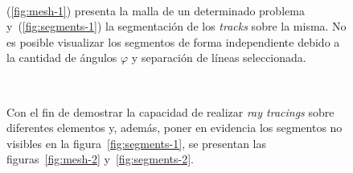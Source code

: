 \documentclass[11pt]{article}
\numberwithin{equation}{section}
\begin{document}
\begin{figure}[!ht]
 \begin{center}
  \\
  \caption{(\ref{fig:mesh-1}) presenta la malla de un determinado problema y~(\ref{fig:segments-1}) la segmentación de los \emph{tracks} sobre la misma. No es posible visualizar los segmentos de forma independiente debido a la cantidad de ángulos $\varphi$ y separación de líneas seleccionada.}
  \label{fig:mesh-and-segments-1}
 \end{center}
\end{figure}

\begin{figure}[!ht]
 \begin{center}
  \\
  \caption{Con el fin de demostrar la capacidad de realizar \emph{ray tracings} sobre diferentes elementos y, además, poner en evidencia los segmentos no visibles en la figura~\ref{fig:segments-1}, se presentan las figuras~\ref{fig:mesh-2} y~\ref{fig:segments-2}.}
  \label{fig:mesh-and-segments-2}
 \end{center}
\end{figure}
\end{document}
